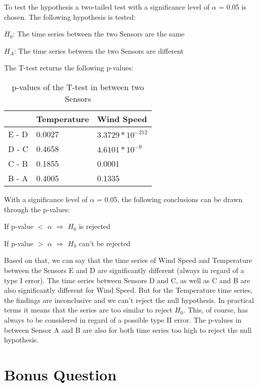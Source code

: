 \documentclass{article}
\begin{document}
To test the hypothesis a two-tailed test with a significance level of $\alpha$ = 0.05 is chosen. The following hypothesis is tested:

\begin{center}
$H_0$: The time series between the two Sensors are the same

$H_A$: The time series between the two Sensors are different
\end{center}

\noindent The T-test returns the following p-values:

\begin{table}[H]
\centering
\begin{tabular}{l|ll}
      & Temperature & Wind Speed      \\ \hline
E - D & 0.0027      & $3.3729 * 10^{-212}$ \\
D - C & 0.4658      & $4.6101 * 10^{-9}$   \\
C - B & 0.1855      & 0.0001          \\
B - A & 0.4005      & 0.1335         
\end{tabular}
\caption{p-values of the T-test in between two Sensors}
\label{tab:my-table}
\end{table}

\noindent With a significance level of $\alpha$ = 0.05, the following conclusions can be drawn through the p-values:

\begin{center}
If p-value $<$ $\alpha$ $\Rightarrow$ $H_0$ is rejected

If p-value $>$ $\alpha$ $\Rightarrow$ $H_0$ can’t be rejected
\end{center}


\noindent Based on that, we can say that the time series of Wind Speed and Temperature between the Sensors E and D are significantly different (always in regard of a type I error). The time series between Sensors D and C, as well as C and B are also significantly different for Wind Speed. But for the Temperature time series, the findings are inconclusive and we can’t reject the null hypothesis. In practical terms it means that the series are too similar to reject $H_0$. This, of course, has always to be considered in regard of a possible type II error. The p-values in between Sensor A and B are also for both time series too high to reject the null hypothesis. 

\section{Bonus Question}
\end{document}
